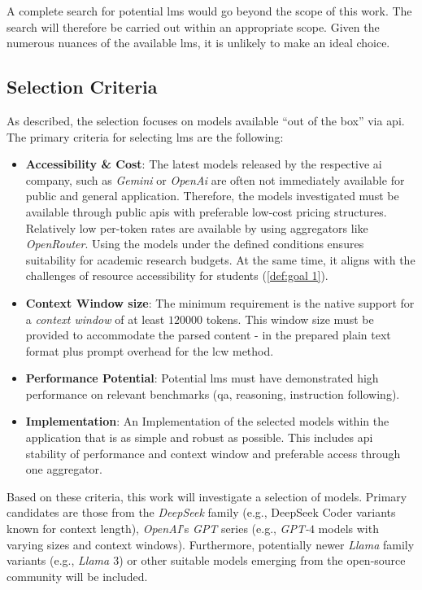 A complete search for potential \acp{lm} would go beyond the scope of this work.
The search will therefore be carried out within an appropriate scope.
%
Given the numerous nuances of the available \acp{lm}, it is unlikely to make an ideal choice.
%
\subsection{Selection Criteria}\label{subsec:model_criteria_api}
As described, the selection focuses on models available \enquote{out of the box} via \ac{api}.
The primary criteria for selecting \acp{lm} are the following:
\begin{itemize}
    \item \textbf{Accessibility \& Cost}: The latest models released by the respective \ac{ai} company, such as \textit{Gemini} or \textit{OpenAi} are often not immediately available for public and general application.
    Therefore, the models investigated must be available through public \acp{api} with preferable low-cost pricing structures.
    Relatively low per-token rates are available by using aggregators like \textit{OpenRouter}.
    Using the models under the defined conditions ensures suitability for academic research budgets.
    At the same time, it aligns with the challenges of resource accessibility for students (\cref{def:goal 1}).
    \item \textbf{Context Window size}:
    The minimum requirement is the native support for a \textit{context window} of at least $120000$ tokens.
    This window size must be provided to accommodate the parsed content -  in the prepared plain text format plus prompt overhead for the \ac{lcw} method.
    \item \textbf{Performance Potential}:
    Potential \acp{lm} must have demonstrated high performance on relevant benchmarks (\ac{qa}, reasoning, instruction following).
    \item \textbf{Implementation}:
    An Implementation of the selected models within the application that is as simple and robust as possible.
    This includes \ac{api} stability of performance and context window and preferable access through one aggregator.
\end{itemize}
%
Based on these criteria, this work will investigate a selection of models.
Primary candidates are those from the \textit{DeepSeek} family (e.g., DeepSeek Coder variants known for context length), \textit{OpenAI}'s \textit{GPT} series (e.g., \textit{GPT-$4$} models with varying sizes and context windows).
Furthermore, potentially newer \textit{Llama} family variants (e.g., \textit{Llama $3$}) or other suitable models emerging from the open-source community will be included.
% 
\newpage

